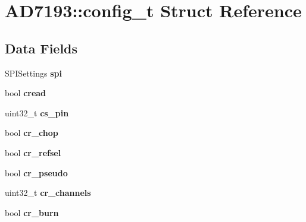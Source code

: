 \hypertarget{structAD7193_1_1config__t}{}\section{A\+D7193\+:\+:config\+\_\+t Struct Reference}
\label{structAD7193_1_1config__t}
\subsection*{Data Fields}
\begin{DoxyCompactItemize}
\item 
\mbox{\label{structAD7193_1_1config__t_a48c4e5e3a852d801c64a0952f0f3a22c}} 
S\+P\+I\+Settings {\bfseries spi}
\item 
\mbox{\label{structAD7193_1_1config__t_a35f454f31c5ff71ab166ea013c85d360}} 
bool {\bfseries cread}
\item 
\mbox{\label{structAD7193_1_1config__t_a913ee2d5d650429b5b2083360b414981}} 
uint32\+\_\+t {\bfseries cs\+\_\+pin}
\item 
\mbox{\label{structAD7193_1_1config__t_a7ff1394748b08c1679fdd49576f45cef}} 
bool {\bfseries cr\+\_\+chop}
\item 
\mbox{\label{structAD7193_1_1config__t_a8792a9873a2a8e5d75015a3c42991baa}} 
bool {\bfseries cr\+\_\+refsel}
\item 
\mbox{\label{structAD7193_1_1config__t_a4a6fc56785320bbdd0b6fe8f4f974686}} 
bool {\bfseries cr\+\_\+pseudo}
\item 
\mbox{\label{structAD7193_1_1config__t_acf93e3e3d0d5f787327ceacd41f96f78}} 
uint32\+\_\+t {\bfseries cr\+\_\+channels}
\item 
\mbox{\label{structAD7193_1_1config__t_ab397fc95d7243c45c7efac43a1e87e89}} 
bool {\bfseries cr\+\_\+burn}
\item 
\mbox{\label{structAD7193_1_1config__t_afb94d61ac3db3914b113f7794655ea46}} 

\end{DoxyCompactItemize}
